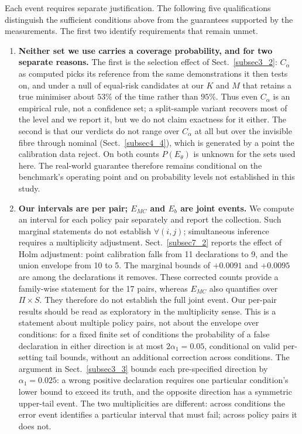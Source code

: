\documentclass[pdflatex,iicol,sn-apa]{sn-jnl}
\theoremstyle{remark}
\begin{document}
\begin{appendices}
Each event requires separate justification. The following five qualifications distinguish
the sufficient conditions above from the guarantees supported by the measurements.
The first two identify requirements that remain unmet.

\begin{enumerate}
\item \textbf{Neither set we use carries a coverage probability, and for two separate reasons.}
The first is the selection effect of Sect.~\ref{subsec3_2}: $C_\alpha$ as computed picks its
reference from the same demonstrations it then tests on, and under a null of equal-risk candidates
at our $K$ and $M$ that retains a true minimiser about $53\%$ of the time rather than $95\%$. Thus
even $C_\alpha$ is an empirical rule, not a confidence set; a split-sample variant recovers most of
the level and we report it, but we do not claim exactness for it either. The second is that our
verdicts do not range over $C_\alpha$ at all but over the invisible fibre through nominal
(Sect.~\ref{subsec4_4}), which is generated by a point the calibration data reject. On both counts
$P(E_\theta)$ is unknown for the sets used here. The real-world guarantee therefore remains
conditional on the benchmark's operating point and on probability levels not established in this study.

\item \textbf{Our intervals are per pair; $E_{MC}$ and $E_b$ are joint events.} We compute an
interval for each policy pair separately and report the collection. Such marginal statements
do not establish $\forall (i,j)$; simultaneous inference requires a multiplicity adjustment.
Sect.~\ref{subsec7_2} reports the effect of Holm adjustment: point
calibration falls from 11 declarations to 9, and the union envelope from 10 to 5. The marginal bounds
of $+0.0091$ and $+0.0095$ are among the declarations it removes.
These corrected counts provide a family-wise statement for the 17 pairs, whereas $E_{MC}$
also quantifies over $\Pi \times S$. They therefore do not establish the full joint event.
Our per-pair results should be read as exploratory in the multiplicity sense. This is a statement
about multiple policy pairs, not about the envelope over conditions: for a fixed finite set
of conditions the probability of a false declaration in either direction is at most
$2\alpha_1 = 0.05$, conditional on valid per-setting tail bounds, without an additional correction
across conditions. The argument in Sect.~\ref{subsec3_3} bounds each pre-specified direction by
$\alpha_1 = 0.025$: a wrong positive declaration requires one particular condition's lower bound
to exceed its truth, and the opposite direction has a symmetric upper-tail event. The two multiplicities are different: across conditions the
error event identifies a particular interval that must fail; across policy pairs it does not.


\end{enumerate}
\end{appendices}
\end{document}
